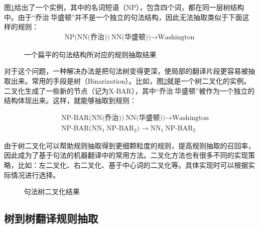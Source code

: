 \parinterval 图\ref{fig:8-32}给出了一个实例，其中的名词短语（NP），包含四个词，都在同一层树结构中。由于“乔治$\ $华盛顿”并不是一个独立的句法结构，因此无法抽取类似于下面这样的规则：
\begin{eqnarray}
\textrm{NP(NN(乔治))}\ \textrm{NN(华盛顿))} \rightarrow \textrm{Washington} \nonumber
\end{eqnarray}


\begin{figure}[htp]
\centering

\caption{一个扁平的句法结构所对应的规则抽取结果}
\label{fig:8-32}
\end{figure}

\parinterval 对于这个问题，一种解决办法是把句法树变得更深，使局部的翻译片段更容易被抽取出来。常用的手段是树{\small{}}（Binarization）。比如，图\ref{fig:8-33}就是一个树二叉化的实例。二叉化生成了一些新的节点（记为X-BAR），其中“乔治$\ $华盛顿”被作为一个独立的结构体现出来。这样，就能够抽取到规则：

\begin{eqnarray}
&& \textrm{NP-BAR(NN(乔治))}\ \textrm{NN(华盛顿))} \rightarrow \textrm{Washington} \nonumber \\
&& \textrm{NP-BAR(}\textrm{NN}_1\ \textrm{NP-}\textrm{BAR}_2) \rightarrow \textrm{NN}_1\ \textrm{NP-}\textrm{BAR}_2 \nonumber
\end{eqnarray}

\parinterval 由于树二叉化可以帮助规则抽取得到更细颗粒度的规则，提高规则抽取的召回率，因此成为了基于句法的机器翻译中的常用方法。二叉化方法也有很多不同的实现策略，比如：左二叉化、右二叉化、基于中心词的二叉化等。具体实现时可以根据实际情况进行选择。

\begin{figure}[htp]
\centering

\caption{句法树二叉化结果}
\label{fig:8-33}
\end{figure}


\subsection{树到树翻译规则抽取}

